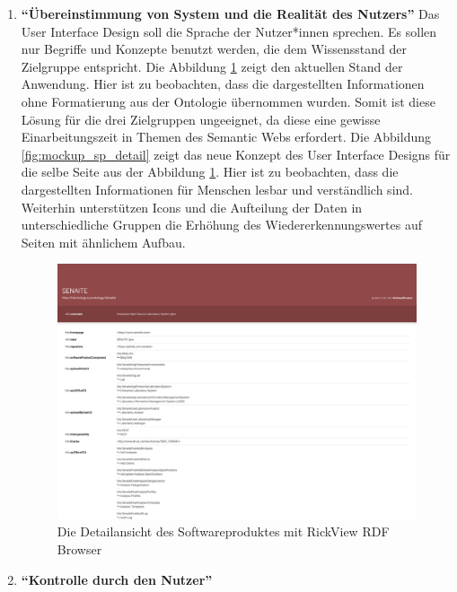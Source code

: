 \begin{enumerate}

\item \textbf{\enquote{\"Ubereinstimmung von System und die Realität des Nutzers}} \newline
Das User Interface Design soll die Sprache der Nutzer*innen sprechen.
Es sollen nur Begriffe und Konzepte benutzt werden, die dem Wissensstand der Zielgruppe entspricht.
Die Abbildung \ref{fig:point2_before} zeigt den aktuellen Stand der Anwendung.
Hier ist zu beobachten, dass die dargestellten Informationen ohne Formatierung aus der Ontologie übernommen wurden.
Somit ist diese Lösung für die drei Zielgruppen ungeeignet, da diese eine gewisse Einarbeitungszeit in Themen des Semantic Webs erfordert.
Die Abbildung \ref{fig:mockup_sp_detail} zeigt das neue Konzept des User Interface Designs für die selbe Seite aus der Abbildung \ref{fig:point2_before}.
Hier ist zu beobachten, dass die dargestellten Informationen für Menschen lesbar und verständlich sind.
Weiterhin unterstützen Icons und die Aufteilung der Daten in unterschiedliche Gruppen die Erhöhung des Wiedererkennungswertes auf Seiten mit ähnlichem Aufbau.

\begin{figure}[ht]
	\centering
    	\includegraphics[width=1.45\textwidth, angle=90]{Images/Punkt_2_davor}
   	\caption[Detailansicht Softwareprodukt]{Die Detailansicht des Softwareproduktes mit RickView RDF Browser}
   	\label{fig:point2_before}
\end{figure}

\clearpage


\item \textbf{\enquote{Kontrolle durch den Nutzer}} \newline


\end{enumerate}

